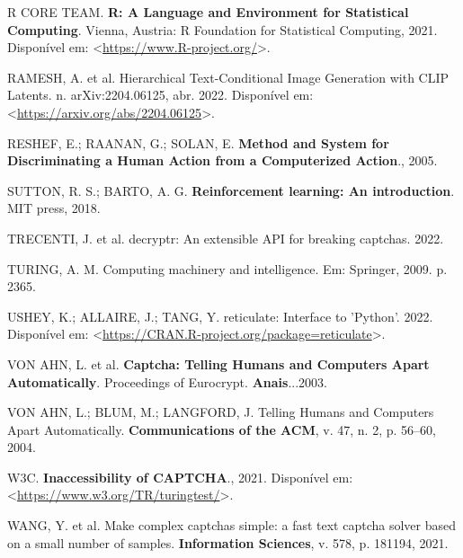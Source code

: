 \documentclass[12pt,twoside,brazilian]{book}
\newlength{\cslhangindent}
\newlength{\cslentryspacingunit} %
\newenvironment{CSLReferences}[2] %
 {%
  \setlength{\parindent}{0pt}
  \ifodd #1
  \let\oldpar\par
  \def\par{\hangindent=\cslhangindent\oldpar}
  \fi
  \setlength{\parskip}{#2\cslentryspacingunit}
 }%
 {}
\begin{document}
\begin{CSLReferences}{0}{1}
\leavevmode{}%
R CORE TEAM. \textbf{R: A Language and Environment for Statistical
Computing}. Vienna, Austria: R Foundation for Statistical Computing,
2021. Disponível em:
\textless{}\url{https://www.R-project.org/}\textgreater.

\leavevmode{}%
RAMESH, A. et al. Hierarchical {Text-Conditional Image Generation} with
{CLIP Latents}. n. arXiv:2204.06125, abr. 2022. Disponível em:
\textless{}\url{https://arxiv.org/abs/2204.06125}\textgreater.

\leavevmode{}%
RESHEF, E.; RAANAN, G.; SOLAN, E. \textbf{Method and System for
Discriminating a Human Action from a Computerized Action}., 2005.

\leavevmode{}%
SUTTON, R. S.; BARTO, A. G. \textbf{Reinforcement learning: An
introduction}. MIT press, 2018.

\leavevmode{}%
TRECENTI, J. et al. decryptr: An extensible API for breaking captchas.
2022.

\leavevmode{}%
TURING, A. M. Computing machinery and intelligence. Em: Springer, 2009.
p. 2365.

\leavevmode{}%
USHEY, K.; ALLAIRE, J.; TANG, Y. reticulate: Interface to 'Python'.
2022. Disponível em:
\textless{}\url{https://CRAN.R-project.org/package=reticulate}\textgreater.

\leavevmode{}%
VON AHN, L. et al. \textbf{Captcha: {Telling} Humans and Computers Apart
Automatically}. Proceedings of Eurocrypt. \textbf{Anais}...2003.

\leavevmode{}%
VON AHN, L.; BLUM, M.; LANGFORD, J. Telling Humans and Computers Apart
Automatically. \textbf{Communications of the ACM}, v. 47, n. 2, p.
56--60, 2004.

\leavevmode{}%
W3C. \textbf{Inaccessibility of CAPTCHA}., 2021. Disponível em:
\textless{}\url{https://www.w3.org/TR/turingtest/}\textgreater.

\leavevmode{}%
WANG, Y. et al. Make complex captchas simple: a fast text captcha solver
based on a small number of samples. \textbf{Information Sciences}, v.
578, p. 181194, 2021.


\end{CSLReferences}
\end{document}
